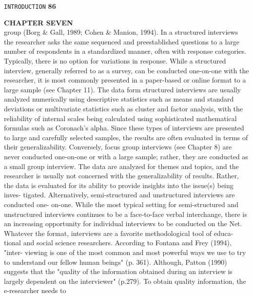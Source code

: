 \documentclass{book}
\begin{document}
\begin{flushright}
\texttt{INTRODUCTION}
\hspace*{0.5cm}
\textbf{86}
\end{flushright}
\vspace*{0.7cm}

\textbf{CHAPTER SEVEN} \\

group (Borg & Gall, 1989; Cohen & Manion, 1994). In a structured interviews the
researcher asks the same sequenced and preestablished questions to a large number of
respondents in a standardized manner, often with response categories. Typically,
there is no option for variations in response. While a structured interview, generally
referred to as a survey, can be conducted one-on-one with the researcher, it is most
commonly presented in a paper-based or online format to a large sample (see Chapter
11). The data form structured interviews are usually analyzed numerically using
descriptive statistics such as means and standard deviations or multivariate statistics
such as cluster and factor analysis, with the reliability of internal scales being calculated
using sophisticated mathematical formulas such as Coronach's alpha. Since these types
of interviews are presented to large and carefully selected samples, the results are often
evaluated in terms of their generalizability. Conversely, focus group interviews (see
Chapter 8) are never conducted one-on-one or with a large sample; rather, they are
conducted as a small group interview. The data are analyzed for themes and topics, and
the researcher is usually not concerned with the generalizability of results. Rather, the
data is evaluated for its ability to provide insights into the issue(s) being inves-
tigated. Alternatively, semi-structured and unstructured interviews are conducted one-
on-one. While the most typical setting for semi-structured and unstructured
interviews continues to be a face-to-face verbal interchange, there is an increasing
opportunity for individual interviews to be conducted on the Net. \\
Whatever the format, interviews are a favorite methodological tool of educa-
tional and social science researchers. According to Fontana and Frey (1994), "inter-
viewing is one of the most common and most powerful ways we use to try to
understand our fellow human beings" (p. 361). Although, Patton (1990) suggests that
the "quality of the information obtained during an interview is largely dependent
on the interviewer" (p.279). To obtain quality information, the e-researcher needs to
\end{document}
